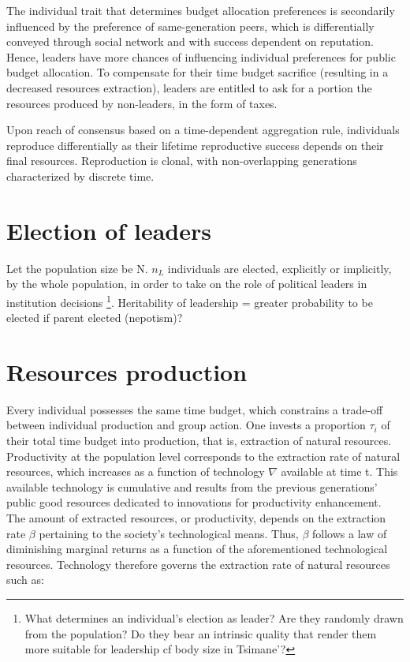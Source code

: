 \documentclass[a4paper]{article}
\begin{document}
The individual trait that determines budget allocation preferences is secondarily influenced by the preference of same-generation peers, which is differentially conveyed through social network and with success dependent on reputation. Hence, leaders have more chances of influencing individual preferences for public budget allocation. To compensate for their time budget sacrifice (resulting in a decreased resources extraction), leaders are entitled to ask for a portion the resources produced by non-leaders, in the form of taxes.

Upon reach of consensus based on a time-dependent aggregation rule, individuals reproduce differentially as their lifetime reproductive success depends on their final resources. Reproduction is clonal, with non-overlapping generations characterized by discrete time.     

\section{Election of leaders}
\label{sec:elec}

Let the population size be N. $n_L$ individuals are elected, explicitly or implicitly, by the whole population, in order to take on the role of political leaders in institution decisions \footnote{What determines an individual's election as leader? Are they randomly drawn from the population? Do they bear an intrinsic quality that render them more suitable for leadership cf body size in Tsimane'?}.
Heritability of leadership = greater probability to be elected if parent elected (nepotism)?

\section{Resources production}
\label{sec:prod}

Every individual possesses the same time budget, which constrains a trade-off between individual production and group action. One invests a proportion $\tau_i$ of their total time budget into production, that is, extraction of natural resources. Productivity at the population level corresponds to the extraction rate of natural resources, which increases as a function of technology $\nabla$ available at time t. This available technology is cumulative and results from the previous generations' public good resources dedicated to innovations for productivity enhancement. The amount of extracted resources, or productivity, depends on the extraction rate $\beta$ pertaining to the society's technological means. Thus, $\beta$ follows a law of diminishing marginal returns as a function of the aforementioned technological resources. Technology therefore governs the extraction rate of natural resources such as:
\end{document}
